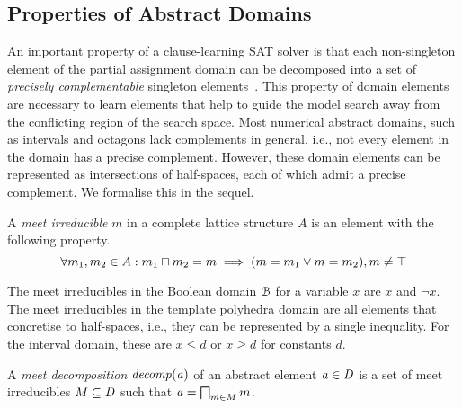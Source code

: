 \subsection{Properties of Abstract Domains}
%
An important property of a clause-learning SAT solver is that each
non-singleton element of the partial assignment domain can be 
decomposed into a set of \textit{precisely complementable} singleton
elements~\cite{dhk2013-popl}.  This property of domain elements
are necessary to learn elements that help to guide the model search away from the
conflicting region of the search space.  
%
Most numerical abstract domains, such as intervals and octagons lack
complements in general, i.e., not every element in the domain has a
precise complement.  However, these domain elements can be represented
as intersections of half-spaces, each of which admit a precise complement.
We formalise this in the sequel.
%
\begin{definition} 
A \emph{meet irreducible} $m$ in a complete lattice 
structure $A$ is an element with the following property.
\begin{equation}
\forall m_1, m_2 \in A: m_1 \sqcap m_2 = m \implies (m = m_1 \lor m = m_2), m \neq \top  
\end{equation}
\end{definition}
%
The meet irreducibles in the Boolean domain $\mathcal{B}$ 
for a variable $x$ are $x$ and $\neg x$. The meet 
irreducibles in the template polyhedra domain are all elements 
that concretise to half-spaces, i.e., they can be represented 
by a single inequality. For the interval domain, these are 
$x \leq d$ or $x \geq d$ for constants $d$. 
%
\begin{definition}
A \emph{meet decomposition} ${\mathit{decomp}}(\mathit{a})$ of an abstract
element $\mathit{a} \in \mathit{D}$ is a set of meet irreducibles $M \subseteq \mathit{D}$ such that 
$\mathit{a}=\bigsqcap_{m\in M} m$.
\end{definition}

